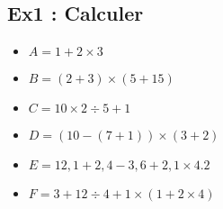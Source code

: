 \newpage

\subsection*{Ex1 : Calculer}

\begin{multicols}{3}\begin{itemize}[label={$\bullet$}]
  \item $A = 1 + 2 \times 3$ 
  \item $B = (2+3) \times (5+15)$
  \item $C = 10 \times 2 \div 5 + 1$
  \item $D = (10 - (7 + 1)) \times (3 + 2)$
  \item $E = 12,1 + 2,4 - 3,6 + 2,1 \times 4.2$
  \item $F = 3 + 12 \div 4 + 1 \times (1 + 2 \times 4)$
\end{itemize}\end{multicols}

\Pointilles[48]


